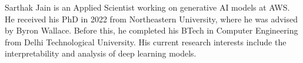 Sarthak Jain is an Applied Scientist working on generative AI models at AWS. He received his PhD in 2022 from Northeastern University, where he was advised by Byron Wallace. Before this, he completed his BTech in Computer Engineering from Delhi Technological University. His current research interests include the interpretability and analysis of deep learning models.